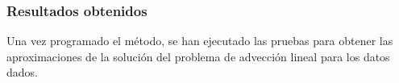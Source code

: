 \documentclass[spanish]{mathnotes}
\begin{document}
	\subsubsection{Resultados obtenidos}
	Una vez programado el método, se han ejecutado las pruebas para obtener las aproximaciones de la solución del problema de advección lineal para los datos dados. 
	\begin{center}
		\begin{figure}
			

\end{figure}
\end{center}
\end{document}
